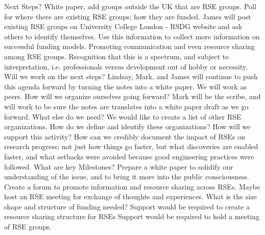 Next Steps?
White paper, add groups outside the UK that are RSE groups.
Poll for where there are existing RSE groups; how they are funded. James will post existing RSE groups on University College London - RSDG website and ask others to identify themselves. Use this information to collect more information on successful funding models.
Promoting communication and even resource sharing among RSE groups.
Recognition that this is a spectrum, and subject to interpretation, i.e. professionals versus development out of hobby or necessity.
Will we work on the next steps?
Lindsay, Mark, and James will continue to push this agenda forward by turning the notes into a white paper. We will work as peers.
How will we organize ourselves going forward?
Mark will be the scribe, and will work to be sure the notes are translates into a white paper draft as we go forward.
What else do we need?
We would like to create a list of other RSE organizations. How do we define and identify these organizations? How will we support this activity?
How can we credibly document the impact of RSEs on research progress; not just how things go faster, but what discoveries are enabled faster, and what setbacks were avoided because good engineering practices were followed.
What are key Milestones?
Prepare a white paper to solidify our understanding of the issue, and to bring it more into the public consciousness.
Create a forum to promote information and resource sharing across RSEs.
Maybe host an RSE meeting for exchange of thoughts and experiences.
What is the size shape and structure of funding needed?
Support would be required to create a resource sharing structure for RSEs
Support would be required to hold a meeting of RSE groups.


